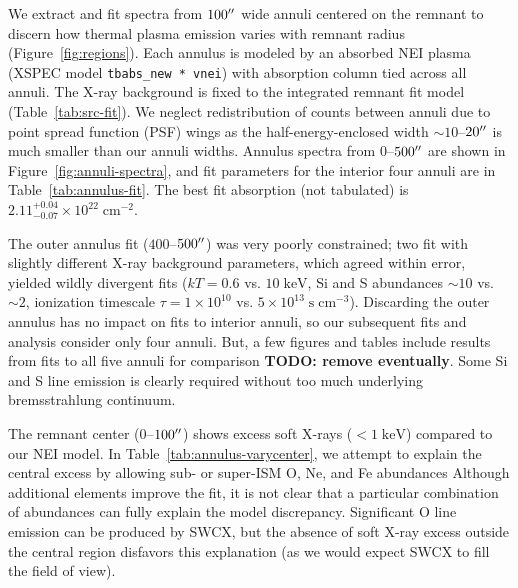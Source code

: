 \documentclass[preprint2,tighten,trackchanges]{aastex6}
\newcommand*{\mt}{\mathrm}
\newcommand*{\unit}[1]{\;\mt{#1}}  %
\newcommand*{\abt}{\mathord{\sim}} %
\newcommand*{\nHUnits}{\times 10^{22} \unit{cm^{-2}}}
\newcommand*{\TauUnits}{\unit{s\;cm^{-3}}}
\begin{document}
We extract and fit spectra from $100\mbox{$^{\prime\prime}$}$ wide annuli centered on the
remnant to discern how thermal plasma emission varies with remnant radius
(Figure~\ref{fig:regions}).
Each annulus is modeled by an absorbed NEI plasma
(XSPEC model \texttt{tbabs\_new * vnei}) with absorption column tied across
all annuli.
The X-ray background is fixed to the integrated remnant fit model
(Table~\ref{tab:src-fit}).
We neglect redistribution of counts between annuli due to point spread function
(PSF) wings as the half-energy-enclosed width $\abt10$--$20\mbox{$^{\prime\prime}$}$ is much
smaller than our annuli widths.
Annulus spectra from $0$--$500\mbox{$^{\prime\prime}$}$ are shown in
Figure~\ref{fig:annuli-spectra}, and fit parameters for the interior four
annuli are in Table~\ref{tab:annulus-fit}.
The best fit absorption (not tabulated) is $2.11^{+0.04}_{-0.07} \nHUnits$.

The outer annulus fit ($400$--$500\mbox{$^{\prime\prime}$}$) was very poorly constrained;
two fit with slightly different X-ray background parameters, which agreed
within error, yielded wildly divergent fits ($kT = 0.6$ vs. $10 \unit{keV}$,
Si and S abundances $\abt10$ vs. $\abt2$,
ionization timescale $\tau = 1 \times 10^{10}$ vs. $5 \times 10^{13} \TauUnits$).
Discarding the outer annulus has no impact on fits to interior annuli, so our
subsequent fits and analysis consider only four annuli.
But, a few figures and tables include results from fits to all five annuli for
comparison \textbf{TODO: remove eventually}.
Some Si and S line emission is clearly required without too much underlying
bremsstrahlung continuum.

The remnant center ($0$--$100\mbox{$^{\prime\prime}$}$) shows excess soft X-rays
($<1 \unit{keV}$) compared to our NEI model.
In Table~\ref{tab:annulus-varycenter}, we attempt to explain the central excess
by allowing sub- or super-ISM O, Ne, and Fe abundances
Although additional elements improve the fit, it is not clear that a particular
combination of abundances can fully explain the model discrepancy.
Significant O line emission can be produced by SWCX, but the absence of soft
X-ray excess outside the central region disfavors this explanation (as we would
expect SWCX to fill the field of view).
\end{document}
